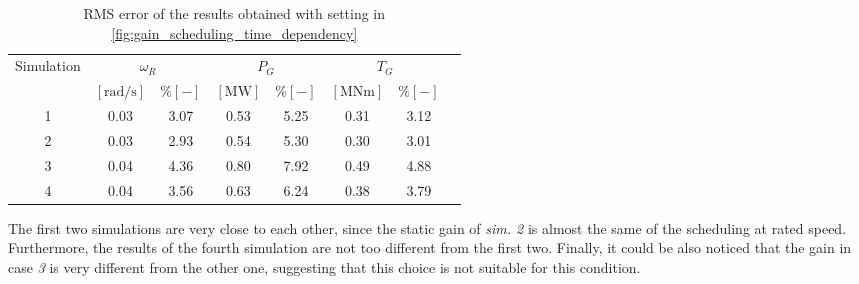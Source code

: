 \begin{table}[htb]
  \caption{RMS error of the results obtained with setting in \autoref{fig:gain_scheduling_time_dependency}}
  \centering
  \begin{tabular}{cccccccc}
    \toprule
      Simulation & \multicolumn{2}{c}{$\omega_R$} & \multicolumn{2}{c}{$P_G$} & \multicolumn{2}{c}{$T_G$} \\ 
       & $\left[\si{\radian\per\second}\right]$ & $ \% \left[-\right]$ & $\left[\si{\mega\watt}\right]$ & $ \% \left[-\right]$ & $\left[\si{\mega\newton\meter} \right]$ & $ \% \left[-\right]$ \\ \midrule       
       1 &  0.03 &  3.07 &  0.53  &  5.25  &  0.31  &  3.12 \\
       2 &  0.03 &  2.93 &  0.54  &  5.30  &  0.30  &  3.01 \\
       3 &  0.04 &  4.36 &  0.80  &  7.92  &  0.49  &  4.88 \\
       4 &  0.04 &  3.56 &  0.63  &  6.24  &  0.38  &  3.79 \\
     \bottomrule
  \end{tabular}
  \label{tab:res_variable_gains}
\end{table}

The first two simulations are very close to each other, since the static gain of \textit{sim. 2} is almost the same of the scheduling at rated speed. Furthermore, the results of the fourth simulation are not too different from the first two. Finally, it could be also noticed that the gain in case \textit{3} is very different from the other one, suggesting that this choice is not suitable for this condition. 

